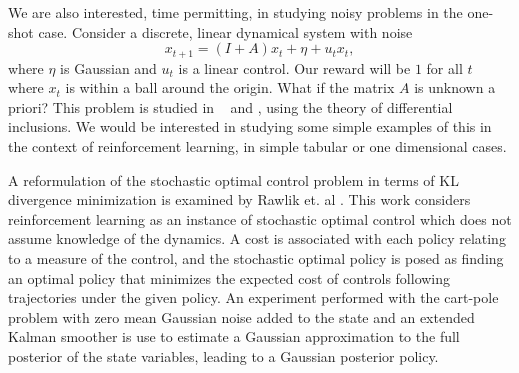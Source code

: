 \documentclass{article}
\begin{document}
We are also interested, time permitting, in studying noisy problems in the one-shot case. Consider a discrete, linear dynamical system with noise
\[
    x_{t+1} = (I + A) x_t + \eta + u_t x_t,
\]
where $\eta$ is Gaussian and $u_t$ is a linear control. Our reward will be $1$ for all $t$ where $x_t$ is within a ball around the origin. What if the matrix $A$ is unknown a priori? This problem is studied in ~\cite{ornikIsraelTopcu} and \cite{ahmadiIsraelTopcu}, using the theory of differential inclusions. We would be interested in studying some simple examples of this in the context of reinforcement learning, in simple tabular or one dimensional cases. 



A reformulation of the stochastic optimal control problem in terms of KL divergence minimization is examined by Rawlik et. al \cite{rawlik2013stochastic}. This work considers reinforcement learning as an instance of stochastic optimal control which does not assume knowledge of the dynamics.  A cost is associated with each policy relating to a measure of the control, and the stochastic optimal policy is posed as finding an optimal policy that minimizes the expected cost of controls following trajectories under the given policy. An experiment performed with the cart-pole problem with zero mean Gaussian noise added to the state and an extended Kalman smoother \cite{stengel1986stochastic} is use to estimate a Gaussian approximation to the full posterior of the state variables, leading to a Gaussian posterior policy.
\iffalse
A specific instance of stochastic optimal control is the reinforcement learning (RL) formalism  which does not assume knowledge of the dynamics or cost function, a situation that may often arise in practice.  Let $\mathcal{C}_t(x, u) \ge 0$ be the cost incurred per stage for choosing control $u$ in state $x$ at time $t$. The SOC problem consists of finding a policy which minimises the expected cost, i.e., solving
\begin{equation}
    \pi^* = \underset{\pi}{\mathrm{argmin}} \left \langle i  \sum_{t=0}^T \mathcal{C}_t (x_t, u_t) \right \rangle_{q_{\pi}}
\end{equation}
where $\langle \cdot \rangle_{q_{\pi}}$ denotes the expectation with respect to the distribution over trajectories under policy $\pi$.
\fi

{}


 

\end{document}
